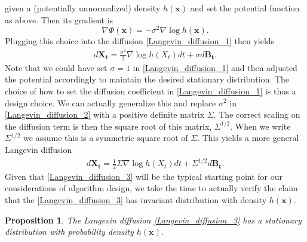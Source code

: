 \documentclass[12pt]{article}
\newcommand{\B}[1]{\boldsymbol{#1}}
\newcommand{\bx}{\mathbf{x}}
\newcommand{\state}[1][t]{X_{#1}}
\newcommand{\BM}[1][t]{B_{#1}} %
\newcommand{\invariantDens}{h} %
\newcommand{\potential}{\Phi} %
\newtheorem{prop}{Proposition}
\begin{document}
given a (potentially unnormalized) density $\invariantDens(\bx)$ and set the potential function as above. Then its gradient is 
\[
\nabla \potential(\bx) = -\sigma^2 \nabla \log \invariantDens(\bx). 
\]
Plugging this choice into the diffusion \ref{Langevin_diffusion_1} then yields 
\begin{align}
d\B\state = \frac{\sigma^2}{2} \nabla \log \invariantDens(\state) dt + \sigma d\B\BM \label{Langevin_diffusion_2}. 
\end{align}
Note that we could have set $\sigma = 1$ in \ref{Langevin_diffusion_1} and then adjusted the potential accordingly to maintain the desired stationary distribution. The choice of 
how to set the diffusion coefficient in \ref{Langevin_diffusion_1} is thus a design choice. We can actually generalize this and replace $\sigma^2$ in \ref{Langevin_diffusion_2} 
with a positive definite matrix $\Sigma$. The correct scaling on the diffusion term is then the square root of this matrix, $\Sigma^{1/2}$. When we write $\Sigma^{1/2}$ we assume 
this is a symmetric square root of $\Sigma$. This yields a more general Langevin diffusion 
\begin{align}
d\B\state = \frac{1}{2} \Sigma \nabla \log \invariantDens(\state) dt + \Sigma^{1/2} d\B\BM \label{Langevin_diffusion_3}.
\end{align}
Given that \ref{Langevin_diffusion_3} will be the typical starting point for our considerations of algorithm design, we take the time to actually verify the claim that the 
\ref{Langevin_diffusion_3} has invariant distribution with density $\invariantDens(\bx)$. 

\begin{prop}
The Langevin diffusion \ref{Langevin_diffusion_3} has a stationary distribution with probability density $\invariantDens(\bx)$. 
\end{prop}
\end{document}
